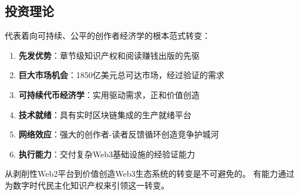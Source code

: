 \subsection{投资理论}

\storyhouse{} 代表着向可持续、公平的创作者经济学的根本范式转变：

\begin{enumerate}
    \item \textbf{先发优势}：章节级知识产权和阅读赚钱出版的先驱
    \item \textbf{巨大市场机会}：1850亿美元总可达市场，经过验证的需求
    \item \textbf{可持续代币经济学}：实用驱动需求，正和价值创造
    \item \textbf{技术就绪}：具有实时区块链集成的生产就绪平台
    \item \textbf{网络效应}：强大的创作者-读者反馈循环创造竞争护城河
    \item \textbf{执行能力}：交付复杂Web3基础设施的经验证能力
\end{enumerate}

\begin{keypoint}
从剥削性Web2平台到价值创造Web3生态系统的转变是不可避免的。\storyhouse{} 有能力通过为数字时代民主化知识产权来引领这一转变。
\end{keypoint}